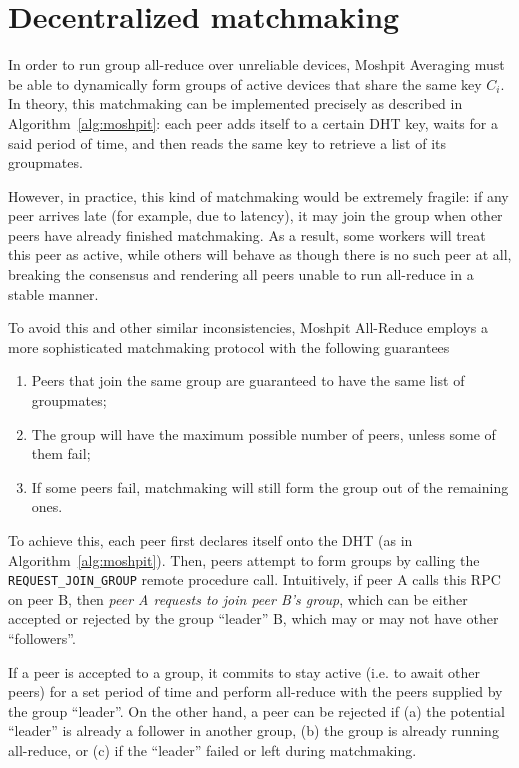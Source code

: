 \section{Decentralized matchmaking}
\label{sect:matchmaking}

In order to run group all-reduce over unreliable devices, Moshpit Averaging must be able to dynamically form groups of active devices that share the same key $C_i$.
In theory, this matchmaking can be implemented precisely as described in Algorithm~\ref{alg:moshpit}: each peer adds itself to a certain DHT key, waits for a said period of time, and then reads the same key to retrieve a list of its groupmates.

However, in practice, this kind of matchmaking would be extremely fragile: if any peer arrives late (for example, due to latency), it may join the group when other peers have already finished matchmaking. As a result, some workers will treat this peer as active, while others will behave as though there is no such peer at all, breaking the consensus and rendering all peers unable to run all-reduce in a stable manner.

To avoid this and other similar inconsistencies, Moshpit All-Reduce employs a more sophisticated matchmaking protocol with the following guarantees 
\begin{enumerate}
    \item Peers that join the same group are guaranteed to have the same list of groupmates;
    \item The group will have the maximum possible number of peers, unless some of them fail;
    \item If some peers fail, matchmaking will still form the group out of the remaining ones.
\end{enumerate}

To achieve this, each peer first declares itself onto the DHT (as in Algorithm~\ref{alg:moshpit}). Then, peers attempt to form groups by calling the \texttt{REQUEST\_JOIN\_GROUP} remote procedure call. Intuitively, if peer A calls this RPC on peer B, then \textit{peer A requests to join peer B's group}, which can be either accepted or rejected by the group ``leader'' B, which may or may not have other ``followers''.

If a peer is accepted to a group, it commits to stay active (i.e. to await other peers) for a set period of time and perform all-reduce with the peers supplied by the group ``leader''. On the other hand, a peer can be rejected if (a) the potential ``leader'' is already a follower in another group, (b) the group is already running all-reduce, or (c) if the ``leader'' failed or left during matchmaking.

